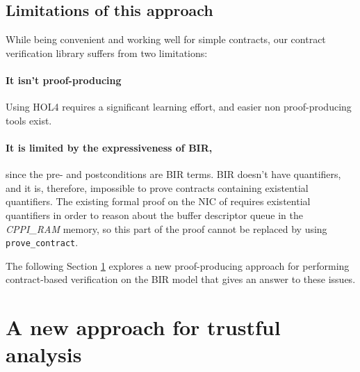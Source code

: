 \documentclass[10pt,a4paper]{article}
\begin{document}
\begin{multicols}{2}
\subsection{Limitations of this approach}

While being convenient and working well for simple contracts, our contract verification library suffers from two limitations:

\paragraph{It isn't {proof-producing}} Using HOL4 requires a significant learning effort, and easier non proof-producing tools exist.

\paragraph{It is limited by the expressiveness of BIR,} since the pre- and postconditions are BIR terms. BIR doesn't have quantifiers, and it is, therefore, impossible to prove contracts containing existential quantifiers. The existing formal proof on the NIC of \cite{haglund_formal_2016} requires existential quantifiers in order to reason about the buffer descriptor queue in the \textit{CPPI\_RAM} memory, so this part of the proof cannot be replaced by using \texttt{prove\_contract}.

\medskip
The following Section \ref{trustful-nic-analysis} explores a new proof-producing approach for performing contract-based verification on the BIR model that gives an answer to these issues.


\section{A new approach for trustful analysis} \label{trustful-nic-analysis}


\end{multicols}
\end{document}
